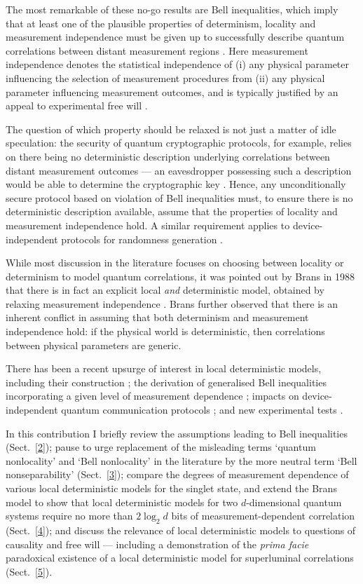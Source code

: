 \documentclass[graybox]{svmult}
\begin{document}
The most remarkable of these no-go results are Bell inequalities, which imply that at least one of the plausible properties of determinism, locality and measurement independence must be given up to successfully describe quantum correlations between distant measurement regions \cite{bell,chsh,bell74}.  Here  measurement independence denotes the statistical independence of (i) any physical parameter influencing the selection of measurement procedures from (ii) any physical parameter influencing measurement outcomes, and is typically justified by an appeal to experimental free will  \cite{dialectica}.

The question of which property should be relaxed is not just a matter of idle speculation: the security of quantum cryptographic protocols, for example, relies on there being no deterministic description underlying correlations between distant measurement outcomes --- an eavesdropper possessing such a description would be able to determine the cryptographic key \cite{bellreview}.  Hence, any unconditionally secure protocol based on violation of Bell inequalities must, to ensure there is no deterministic description available, assume that the properties of locality and measurement independence hold. A similar requirement applies to device-independent protocols for randomness generation \cite{bellreview}.

While most discussion in the literature focuses on choosing between locality or determinism to model quantum correlations, it was pointed out by Brans in 1988 that there is in fact an explicit local {\it and} deterministic model, obtained by relaxing measurement independence \cite{brans}.  Brans further observed that there is an inherent conflict in assuming that both determinism and measurement independence hold: if the physical world is deterministic, then correlations between physical parameters are generic. 

There has been a recent upsurge of interest in local deterministic models, including their construction \cite{degorre, hallmodel,bg}; the derivation of generalised Bell inequalities incorporating a given level of measurement dependence  \cite{hallmodel, bg, relaxed,banik, koh,scarani, kay, gisinbell, chaves}; impacts on device-independent quantum communication protocols \cite{koh,scarani,kay}; and new experimental tests \cite{jason,gisinbellexp}.

In this contribution I briefly review the assumptions leading to  Bell inequalities (Sect.~\ref{2}); pause to urge replacement of the misleading terms `quantum nonlocality' and `Bell nonlocality' in the literature by the more neutral term `Bell nonseparability' (Sect.~\ref{3}); compare the degrees of measurement dependence of various local deterministic models for the singlet state, and extend the Brans model to show that local deterministic models for two $d$-dimensional quantum systems require no more than $2\log_2 d$ bits of measurement-dependent correlation (Sect.~\ref{4}); and discuss the relevance of local deterministic models to questions of causality and free will --- including a demonstration of the {\it prima facie }paradoxical existence of a local deterministic model for superluminal correlations (Sect.~\ref{5}).
\end{document}
